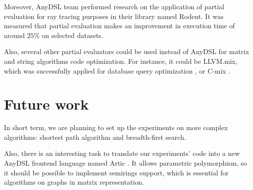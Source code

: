 \documentclass[conference]{IEEEtran}
\begin{document}
Moreover, AnyDSL team performed research \cite{perard2019rodent} on the application of partial evaluation for ray tracing purposes in their library named Rodent. It was measured that partial evaluation makes an improvement in execution time of around $25\%$ on selected datasets.

Also, several other partial evaluators could be used instead of AnyDSL for matrix and string algorithms code optimization. For instance, it could be LLVM.mix, which was successfully applied for database query optimization \cite{sharygin2017runtime}, or C-mix \cite{jones1993partial}.

\section{Future work}

In short term, we are planning to set up the experiments on more complex algorithms: shortest path algorithm and breadth-first search.

Also, there is an interesting task to translate our experiments' code into a new AnyDSL frontend language named Artic \cite{articgit}. It allows parametric polymorphism, so it should be possible to implement semirings support, which is essential for algorithms on graphs in matrix representation.




\end{document}
